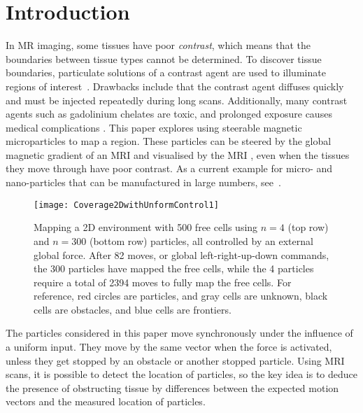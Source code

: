 \section{Introduction}\label{sec:Intro}
In MR imaging, some tissues have poor \emph{contrast}, which means that the boundaries between tissue types cannot be determined.
 To discover tissue boundaries, particulate solutions of a contrast agent are used to illuminate regions of interest~\cite{na2009inorganic}. 
 Drawbacks include that the contrast agent diffuses quickly and must be injected repeatedly during long scans. 
 Additionally, many contrast agents such as gadolinium chelates are toxic, and prolonged exposure causes medical complications \cite{caravan1999gadolinium}. 
This paper explores using steerable magnetic microparticles to map a region. 
These particles can be steered by the global magnetic gradient of an MRI and visualised by the MRI \cite{Vartholomeos2012}, even when the tissues they move through  have poor contrast.
As a current example for micro- and nano-particles that can be manufactured in large numbers, see~\cite{Chowdhury2015,martel2014computer,kim2015imparting,Donald2013,Ghosh2009,Ou2013,qiu2015magnetic}.

\begin{figure}
\begin{center}
	\texttt{[image: Coverage2DwithUnformControl1]}
\end{center}
\caption{\label{fig:Coverage2DwithUnformControl}
Mapping a 2D environment with 500 free cells using $n=4$ (top row) and $n=300$ (bottom row) particles, all controlled by an external global force. After 82 moves, or global left-right-up-down commands, the 300 particles have mapped the free cells, while the 4 particles require a total of 2394 moves to fully map the free cells. For reference, red circles are particles, and gray cells are unknown, black cells are obstacles, and blue cells are frontiers.
}
\end{figure}

The particles considered in this paper move synchronously under the influence of a uniform input.
They move by the same vector when the force is activated,
unless they get stopped by an obstacle or another stopped particle.  
Using MRI scans, it is possible to detect the location of particles, so the key idea is to deduce the presence of obstructing tissue by differences between the expected motion vectors and 
the measured location of particles.

